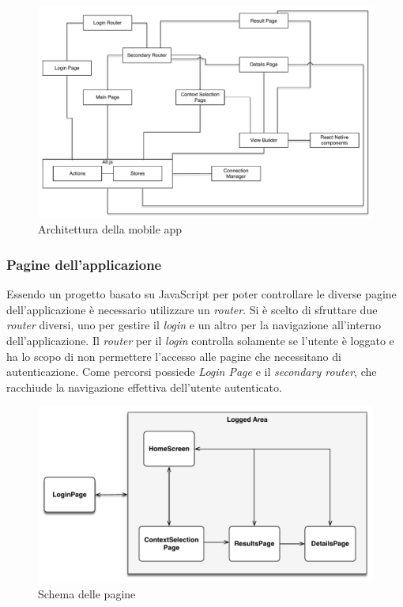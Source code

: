 \begin{figure}[h]
	\centering
	\includegraphics[width=\textwidth]{4-progettazione-alto-livello/Immagini/app_architecture.pdf}
	\caption{Architettura della mobile app}\label{fig:app-architecture}
\end{figure}

\subsubsection{Pagine dell'applicazione}

Essendo un progetto basato su JavaScript per poter controllare le diverse pagine dell'applicazione è necessario utilizzare un \emph{router}. Si è scelto di sfruttare due \emph{router} diversi, uno per gestire il \emph{login} e un altro per la navigazione all'interno dell'applicazione. Il \emph{router} per il \emph{login} controlla solamente se l'utente è loggato e ha lo scopo di non permettere l'accesso alle pagine che necessitano di autenticazione. Come percorsi possiede \emph{Login Page} e il \emph{secondary router}, che racchiude la navigazione effettiva dell'utente autenticato.

\begin{figure}[H]
	\centering
	\includegraphics[width=\textwidth]{4-progettazione-alto-livello/Immagini/screen_schema.pdf}
	\caption{Schema delle pagine}\label{fig:screen-schema}
\end{figure}

